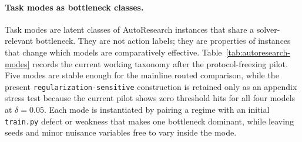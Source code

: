 \documentclass{article}
\begin{document}
\paragraph{Task modes as bottleneck classes.}
Task modes are latent classes of AutoResearch instances that share a solver-relevant bottleneck.
They are not action labels; they are properties of instances that change which models are comparatively effective.
Table~\ref{tab:autoresearch-modes} records the current working taxonomy after the protocol-freezing pilot.
Five modes are stable enough for the mainline routed comparison, while the present \texttt{regularization-sensitive} construction is retained only as an appendix stress test because the current pilot shows zero threshold hits for all four models at $\delta=0.05$.
Each mode is instantiated by pairing a regime with an initial \texttt{train.py} defect or weakness that makes one bottleneck dominant, while leaving seeds and minor nuisance variables free to vary inside the mode.
\end{document}

